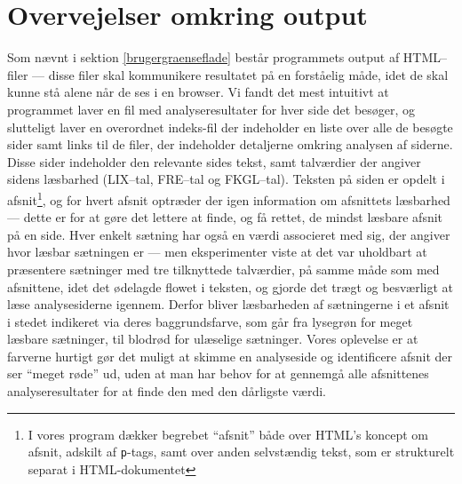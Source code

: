 \documentclass[a4paper,oneside]{memoir}
\begin{document}
\section{Overvejelser omkring output}

Som nævnt i sektion \ref{brugergraenseflade} består programmets output
af HTML--filer --- disse filer skal kommunikere resultatet på en
forståelig måde, idet de skal kunne stå alene når de ses i en
browser. Vi fandt det mest intuitivt at programmet laver en fil med
analyseresultater for hver side det besøger, og slutteligt laver en
overordnet indeks-fil der indeholder en liste over alle de besøgte
sider samt links til de filer, der indeholder detaljerne omkring
analysen af siderne. Disse sider indeholder den relevante sides tekst,
samt talværdier der angiver sidens læsbarhed (LIX--tal, FRE--tal og
FKGL--tal). Teksten på siden er opdelt i afsnit\footnote{I vores
  program dækker begrebet ``afsnit'' både over HTML's koncept om
  afsnit, adskilt af \texttt{p}-tags, samt over anden selvstændig
  tekst, som er strukturelt separat i HTML-dokumentet}, og for hvert
afsnit optræder der igen information om afsnittets læsbarhed --- dette
er for at gøre det lettere at finde, og få rettet, de mindst læsbare
afsnit på en side. Hver enkelt sætning har også en værdi associeret
med sig, der angiver hvor læsbar sætningen er --- men eksperimenter
viste at det var uholdbart at præsentere sætninger med tre tilknyttede
talværdier, på samme måde som med afsnittene, idet det ødelagde flowet
i teksten, og gjorde det trægt og besværligt at læse analysesiderne
igennem. Derfor bliver læsbarheden af sætningerne i et afsnit i stedet
indikeret via deres baggrundsfarve, som går fra lysegrøn for meget
læsbare sætninger, til blodrød for ulæselige sætninger. Vores
oplevelse er at farverne hurtigt gør det muligt at skimme en
analyseside og identificere afsnit der ser ``meget røde'' ud, uden at
man har behov for at gennemgå alle afsnittenes analyseresultater for
at finde den med den dårligste værdi.
\end{document}
